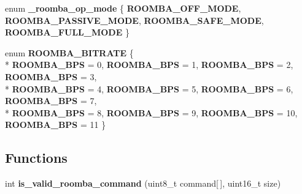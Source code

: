 \begin{DoxyCompactItemize}
\item 
\hypertarget{group__roomba-lib_ga0c31a759b4cf7799473fe7b259dec1e2}{}enum {\bfseries \+\_\+roomba\+\_\+op\+\_\+mode} \{ {\bfseries R\+O\+O\+M\+B\+A\+\_\+\+O\+F\+F\+\_\+\+M\+O\+D\+E}, 
{\bfseries R\+O\+O\+M\+B\+A\+\_\+\+P\+A\+S\+S\+I\+V\+E\+\_\+\+M\+O\+D\+E}, 
{\bfseries R\+O\+O\+M\+B\+A\+\_\+\+S\+A\+F\+E\+\_\+\+M\+O\+D\+E}, 
{\bfseries R\+O\+O\+M\+B\+A\+\_\+\+F\+U\+L\+L\+\_\+\+M\+O\+D\+E}
 \}\label{group__roomba-lib_ga0c31a759b4cf7799473fe7b259dec1e2}

\item 
\hypertarget{group__roomba-lib_gac817969a7f890c4cb8a32db5284a2f00}{}enum {\bfseries R\+O\+O\+M\+B\+A\+\_\+\+B\+I\+T\+R\+A\+T\+E} \{ \\*
{\bfseries R\+O\+O\+M\+B\+A\+\_\+B\+P\+S} = 0, 
{\bfseries R\+O\+O\+M\+B\+A\+\_\+B\+P\+S} = 1, 
{\bfseries R\+O\+O\+M\+B\+A\+\_\+B\+P\+S} = 2, 
{\bfseries R\+O\+O\+M\+B\+A\+\_\+B\+P\+S} = 3, 
\\*
{\bfseries R\+O\+O\+M\+B\+A\+\_\+B\+P\+S} = 4, 
{\bfseries R\+O\+O\+M\+B\+A\+\_\+B\+P\+S} = 5, 
{\bfseries R\+O\+O\+M\+B\+A\+\_\+B\+P\+S} = 6, 
{\bfseries R\+O\+O\+M\+B\+A\+\_\+B\+P\+S} = 7, 
\\*
{\bfseries R\+O\+O\+M\+B\+A\+\_\+B\+P\+S} = 8, 
{\bfseries R\+O\+O\+M\+B\+A\+\_\+B\+P\+S} = 9, 
{\bfseries R\+O\+O\+M\+B\+A\+\_\+B\+P\+S} = 10, 
{\bfseries R\+O\+O\+M\+B\+A\+\_\+B\+P\+S} = 11
 \}\label{group__roomba-lib_gac817969a7f890c4cb8a32db5284a2f00}

\end{DoxyCompactItemize}
\subsection*{Functions}
\begin{DoxyCompactItemize}
\item 
\hypertarget{group__roomba-lib_gaf230b08ce6e9261ed954b51db2f2898f}{}int {\bfseries is\+\_\+valid\+\_\+roomba\+\_\+command} (uint8\+\_\+t command\mbox{[}$\,$\mbox{]}, uint16\+\_\+t size)\label{group__roomba-lib_gaf230b08ce6e9261ed954b51db2f2898f}

\end{DoxyCompactItemize}
